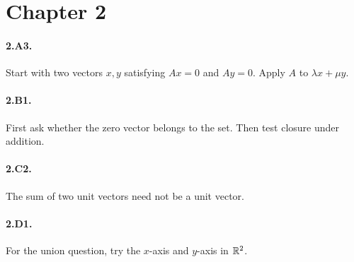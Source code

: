 \section*{Chapter 2}

\paragraph{2.A3.}
Start with two vectors $x,y$ satisfying $Ax=0$ and $Ay=0$. Apply $A$ to
$\lambda x+\mu y$.

\paragraph{2.B1.}
First ask whether the zero vector belongs to the set. Then test closure under
addition.

\paragraph{2.C2.}
The sum of two unit vectors need not be a unit vector.

\paragraph{2.D1.}
For the union question, try the $x$-axis and $y$-axis in $\mathbb{R}^2$.
